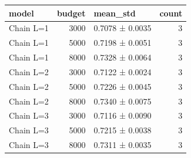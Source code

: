 \begin{tabular}{lrlr}
\toprule
model & budget & mean\_std & count \\
\midrule
Chain L=1 & 3000 & 0.7078 ± 0.0035 & 3 \\
Chain L=1 & 5000 & 0.7198 ± 0.0051 & 3 \\
Chain L=1 & 8000 & 0.7328 ± 0.0064 & 3 \\
Chain L=2 & 3000 & 0.7122 ± 0.0024 & 3 \\
Chain L=2 & 5000 & 0.7226 ± 0.0045 & 3 \\
Chain L=2 & 8000 & 0.7340 ± 0.0075 & 3 \\
Chain L=3 & 3000 & 0.7116 ± 0.0090 & 3 \\
Chain L=3 & 5000 & 0.7215 ± 0.0038 & 3 \\
Chain L=3 & 8000 & 0.7311 ± 0.0035 & 3 \\
\bottomrule
\end{tabular}

